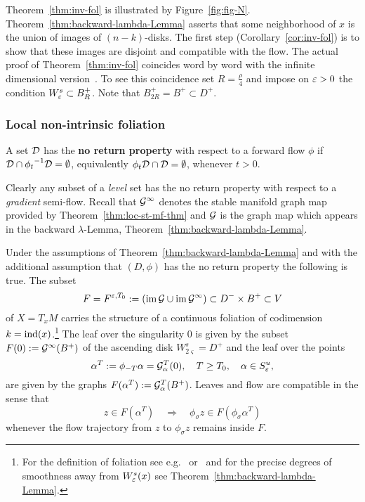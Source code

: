 \documentclass{article}
\begin{document}
Theorem~\ref{thm:inv-fol} is illustrated by Figure~\ref{fig:fig-N}.
Theorem~\ref{thm:backward-lambda-Lemma} asserts that some
neighborhood of $x$ is the union of images of $(n-k)$-disks.
The first step (Corollary~\ref{cor:inv-fol}) is to show that these
images are disjoint and compatible with the flow.
The actual proof of Theorem~\ref{thm:inv-fol} coincides word by
word with the infinite dimensional version~\cite[Thm.~C]{weber:2014c}.
To see this coincidence set $R=\frac{\rho}{4}$
and impose on ${\varepsilon}>0$ the condition $W^s_{{\varepsilon}}\subset B^+_R$.
Note that $B^+_{2R}=B^+\subset D^+$.


\subsubsection*{Local non-intrinsic foliation}\label{sec:local-fol}
\begin{definition}\label{def:no-return}
A set ${\mathcal{D}}$ has the {\bf no return property}
with respect to a forward flow $\phi$ if ${\mathcal{D}}\cap{\phi_t}^{-1}{\mathcal{D}}=\emptyset$, equivalently
$\phi_t {\mathcal{D}}\cap {\mathcal{D}}=\emptyset$, whenever $t>0$.
\end{definition}

Clearly any subset of a \emph{level} set has the no return property with respect to a \emph{gradient} semi-flow.
Recall that ${\mathcal{G}}^\infty$ denotes the stable manifold graph map provided by
Theorem~\ref{thm:loc-st-mf-thm} and ${\mathcal{G}}$ is the graph map which
appears in the backward $\lambda$-Lemma, Theorem~\ref{thm:backward-lambda-Lemma}.

\begin{corollary}\label{cor:inv-fol}
Under the assumptions of Theorem~\ref{thm:backward-lambda-Lemma}
and with the additional assumption that $(D,\phi)$ has the no return property the
following is true. The subset
$$
     F=F^{{\varepsilon},T_0}
     :=\left({\rm im\, }{\mathcal{G}}\cup{\rm im\, }{\mathcal{G}}^\infty\right)
     \subset D^-\times B^+\subset V
$$
of $X=T_x M$ carries the structure of a
continuous foliation of codimension $k={\rm ind}(x)$.\footnote{
  For the definition of foliation see e.g.~\cite{lawson:1974a}
  or~\cite[Sec.~4.1]{pesin:2004a} and
  for the precise degrees of smoothness away from $W^s_{\varepsilon}(x)$ see
  Theorem~\ref{thm:backward-lambda-Lemma}.
  }
The leaf over the singularity $0$ is given by the subset
$F(0):={\mathcal{G}}^\infty(B^+)$ of the ascending disk $W^s_{2\varsigma}=D^+$
and the leaf over the points
$$
     \alpha^T:=\phi_{-T}{\alpha}={\mathcal{G}}^T_{\alpha}(0),\quad
     T\ge T_0,\quad {\alpha}\in S^u_{\varepsilon},
$$
are given by the graphs $F({\alpha^T}):={\mathcal{G}}^T_{\alpha}(B^+)$.
Leaves and flow are compatible in the sense that
$$
     z\in F({\alpha^T})
     \quad\Rightarrow\quad
     \phi_\sigma z\in F(\phi_\sigma{\alpha^T})
$$
whenever the flow trajectory from $z$ to 
$\phi_\sigma z$ remains inside $F$.
\end{corollary}
\end{document}
